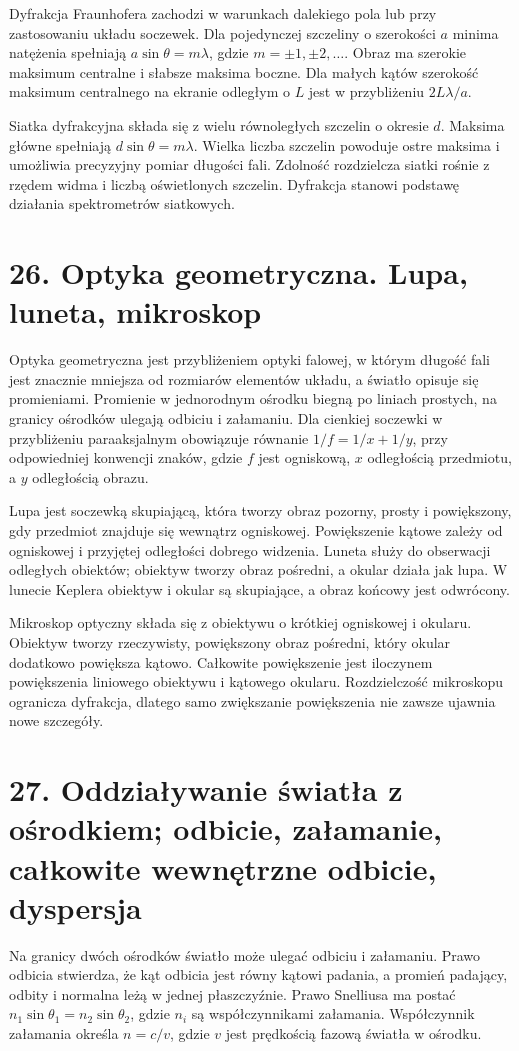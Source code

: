 \documentclass[11pt,a4paper,oneside]{report}
\begin{document}
Dyfrakcja Fraunhofera zachodzi w warunkach dalekiego pola lub przy zastosowaniu układu soczewek. Dla pojedynczej szczeliny o szerokości \(a\) minima natężenia spełniają \(a\sin\theta=m\lambda\), gdzie \(m=\pm1,\pm2,\ldots\). Obraz ma szerokie maksimum centralne i słabsze maksima boczne. Dla małych kątów szerokość maksimum centralnego na ekranie odległym o \(L\) jest w przybliżeniu \(2L\lambda/a\).

Siatka dyfrakcyjna składa się z wielu równoległych szczelin o okresie \(d\). Maksima główne spełniają \(d\sin\theta=m\lambda\). Wielka liczba szczelin powoduje ostre maksima i umożliwia precyzyjny pomiar długości fali. Zdolność rozdzielcza siatki rośnie z rzędem widma i liczbą oświetlonych szczelin. Dyfrakcja stanowi podstawę działania spektrometrów siatkowych.

\section{26. Optyka geometryczna. Lupa, luneta, mikroskop}
Optyka geometryczna jest przybliżeniem optyki falowej, w którym długość fali jest znacznie mniejsza od rozmiarów elementów układu, a światło opisuje się promieniami. Promienie w jednorodnym ośrodku biegną po liniach prostych, na granicy ośrodków ulegają odbiciu i załamaniu. Dla cienkiej soczewki w przybliżeniu paraaksjalnym obowiązuje równanie \(1/f=1/x+1/y\), przy odpowiedniej konwencji znaków, gdzie \(f\) jest ogniskową, \(x\) odległością przedmiotu, a \(y\) odległością obrazu.

Lupa jest soczewką skupiającą, która tworzy obraz pozorny, prosty i powiększony, gdy przedmiot znajduje się wewnątrz ogniskowej. Powiększenie kątowe zależy od ogniskowej i przyjętej odległości dobrego widzenia. Luneta służy do obserwacji odległych obiektów; obiektyw tworzy obraz pośredni, a okular działa jak lupa. W lunecie Keplera obiektyw i okular są skupiające, a obraz końcowy jest odwrócony.

Mikroskop optyczny składa się z obiektywu o krótkiej ogniskowej i okularu. Obiektyw tworzy rzeczywisty, powiększony obraz pośredni, który okular dodatkowo powiększa kątowo. Całkowite powiększenie jest iloczynem powiększenia liniowego obiektywu i kątowego okularu. Rozdzielczość mikroskopu ogranicza dyfrakcja, dlatego samo zwiększanie powiększenia nie zawsze ujawnia nowe szczegóły.

\section{27. Oddziaływanie światła z ośrodkiem; odbicie, załamanie, całkowite wewnętrzne odbicie, dyspersja}
Na granicy dwóch ośrodków światło może ulegać odbiciu i załamaniu. Prawo odbicia stwierdza, że kąt odbicia jest równy kątowi padania, a promień padający, odbity i normalna leżą w jednej płaszczyźnie. Prawo Snelliusa ma postać \(n_1\sin\theta_1=n_2\sin\theta_2\), gdzie \(n_i\) są współczynnikami załamania. Współczynnik załamania określa \(n=c/v\), gdzie \(v\) jest prędkością fazową światła w ośrodku.
\end{document}
